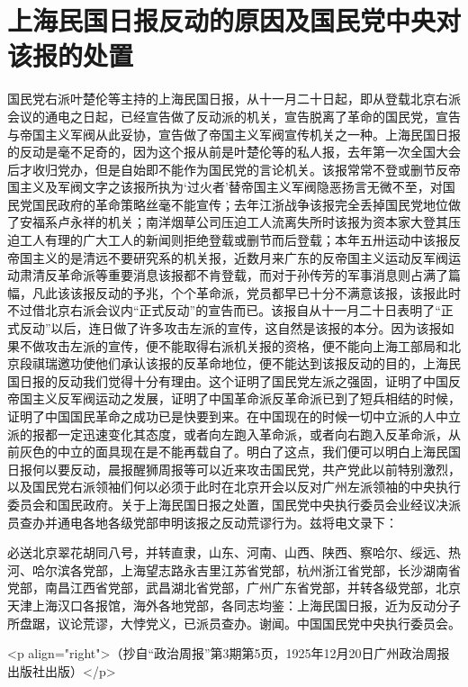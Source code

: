 \section[上海民国日报反动的原因及国民党中央对该报的处置（一九二五年十二月二十日）]{上海民国日报反动的原因及国民党中央对该报的处置}


国民党右派叶楚伦等主持的上海民国日报，从十一月二十日起，即从登载北京右派会议的通电之日起，已经宣告做了反动派的机关，宣告脱离了革命的国民党，宣告与帝国主义军阀从此妥协，宣告做了帝国主义军阀宣传机关之一种。上海民国日报的反动是毫不足奇的，因为这个报从前是叶楚伦等的私人报，去年第一次全国大会后才收归党办，但是自始即不能作为国民党的言论机关。该报常常不登或删节反帝国主义及军阀文字之该报所执为‘过火者’替帝国主义军阀隐恶扬言无微不至，对国民党国民政府的革命策略丝毫不能宣传；去年江浙战争该报完全丢掉国民党地位做了安福系卢永祥的机关；南洋烟草公司压迫工人流离失所时该报为资本家大登其压迫工人有理的广大工人的新闻则拒绝登载或删节而后登载；本年五卅运动中该报反帝国主义的是清远不要研究系的机关报，近数月来广东的反帝国主义运动反军阀运动肃清反革命派等重要消息该报都不肯登载，而对于孙传芳的军事消息则占满了篇幅，凡此该该报反动的予兆，个个革命派，党员都早已十分不满意该报，该报此时不过借北京右派会议内“正式反动”的宣告而已。该报自从十一月二十日表明了“正式反动”以后，连日做了许多攻击左派的宣传，这自然是该报的本分。因为该报如果不做攻击左派的宣传，便不能取得右派机关报的资格，便不能向上海工部局和北京段祺瑞邀功使他们承认该报的反革命地位，便不能达到该报反动的目的，上海民国日报的反动我们觉得十分有理由。这个证明了国民党左派之强固，证明了中国反帝国主义反军阀运动之发展，证明了中国革命派反革命派已到了短兵相结的时候，证明了中国国民革命之成功已是快要到来。在中国现在的时候一切中立派的人中立派的报都一定迅速变化其态度，或者向左跑入革命派，或者向右跑入反革命派，从前灰色的中立的面具现在是不能再载自了。明白了这点，我们便可以明白上海民国日报何以要反动，晨报醒狮周报等可以近来攻击国民党，共产党此以前特别激烈，以及国民党右派领袖们何以必须于此时在北京开会以反对广州左派领袖的中央执行委员会和国民政府。关于上海民国日报之处置，国民党中央执行委员会业经议决派员查办并通电各地各级党部申明该报之反动荒谬行为。兹将电文录下：

必送北京翠花胡同八号，并转直隶，山东、河南、山西、陕西、察哈尔、绥远、热河、哈尔滨各党部，上海望志路永吉里江苏省党部，杭州浙江省党部，长沙湖南省党部，南昌江西省党部，武昌湖北省党部，广州广东省党部，并转各级党部，北京天津上海汉口各报馆，海外各地党部，各同志均鉴：上海民国日报，近为反动分子所盘踞，议论荒谬，大悖党义，已派员查办。谢闻。中国国民党中央执行委员会。

<p align="right">（抄自“政治周报”第3期第5页，1925年12月20日广州政治周报出版社出版）</p>

